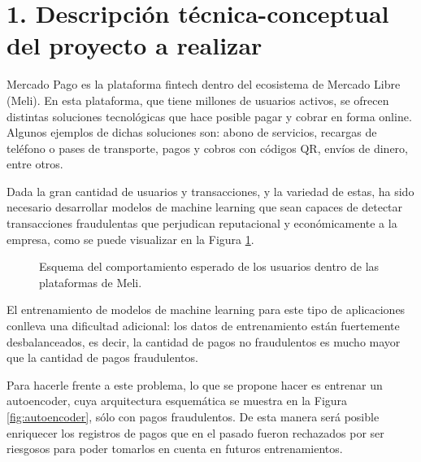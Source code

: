 \documentclass[
11pt, %
]{charter}
\begin{document}
\section{1. Descripción técnica-conceptual del proyecto a realizar}
\label{sec:descripcion}

Mercado Pago es la plataforma fintech dentro del ecosistema de Mercado Libre (Meli). En esta plataforma, que tiene millones de usuarios activos, se ofrecen distintas soluciones tecnológicas que hace posible pagar y cobrar en forma online. Algunos ejemplos de dichas soluciones son: abono de servicios, recargas de teléfono o pases de transporte, pagos y cobros con códigos QR, envíos de dinero, entre otros.

Dada la gran cantidad de usuarios y transacciones, y la variedad de estas, ha sido necesario desarrollar modelos de machine learning que sean capaces de detectar transacciones fraudulentas que perjudican reputacional y económicamente  a la empresa, como se puede visualizar en la Figura \ref{fig:fraudster}.

\begin{figure}[H]
\centering
{}
\caption{Esquema del comportamiento esperado de los usuarios dentro de las plataformas de Meli.}
\label{fig:fraudster}
\end{figure}

El entrenamiento de modelos de machine learning para este tipo de aplicaciones conlleva una dificultad adicional: los datos de entrenamiento están fuertemente desbalanceados, es decir, la cantidad de pagos no fraudulentos es mucho mayor que la cantidad de pagos fraudulentos.

Para hacerle frente a este problema, lo que se propone hacer es entrenar un autoencoder, cuya arquitectura esquemática se muestra en la Figura \ref{fig:autoencoder}, sólo con pagos fraudulentos. De esta manera será posible enriquecer los registros de pagos que en el pasado fueron rechazados por ser riesgosos para poder tomarlos en cuenta en futuros entrenamientos. 
\end{document}
